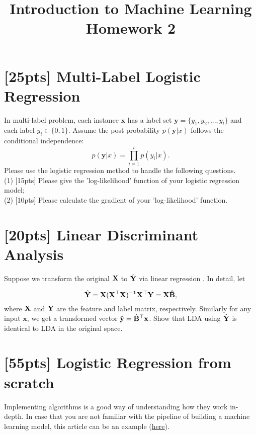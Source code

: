 \documentclass{article}
\title{Introduction to Machine Learning\\Homework 2}
\begin{document}
	\maketitle
	\section{[25pts] Multi-Label Logistic Regression}
    In multi-label problem, each instance $\bm{x}$ has a label set $\bm{y}=\{y_1,y_2,...,y_l\}$ and each label $y_i\in\{0,1\}$. Assume the post probability $p(\bm{y}|x)$ follows the conditional independence:\\
    \begin{equation}
    p(\bm{y}|x)=\prod\limits_{i=1}^l p(y_i|x).
    \end{equation}
    Please use the logistic regression method to handle the following questions.\\
    (1) [15pts] Please give the 'log-likelihood' function of your logistic regression model;\\
    (2) [10pts] Please calculate the gradient of your 'log-likelihood' function.\\     



\vspace{3cm}


	\section{[20pts] Linear Discriminant Analysis}
	
	Suppose we transform the original $\bf X$ to $\hat{\bf Y}$ via linear regression . In detail, let 
	
	\begin{equation*}
	\hat{\bf Y} = \bf X(\bf X^{\top} \bf X)^{-1}\bf X^{\top}\bf Y = \bf X\hat{\bf B},
	\end{equation*}
	where $\bf X$ and $\bf Y$ are the feature and label matrix, respectively.
	 Similarly for any input $\mathbf{x}$, we get a transformed vector $\hat{\mathbf{y}} = \hat{\bf B}^{\top}\mathbf{x}$. Show that LDA using $\hat{\bf Y}$ is identical to LDA in the original space.
	
	
	
\vspace{3cm}


\section{[55pts] Logistic Regression from scratch  }
Implementing algorithms is a good way of understanding how they work in-depth. In case that you are not familiar with the pipeline of building a machine learning model, this article can be an example (\href{https://www.jianshu.com/p/ecb89148ed64}{here}).
\end{document}
